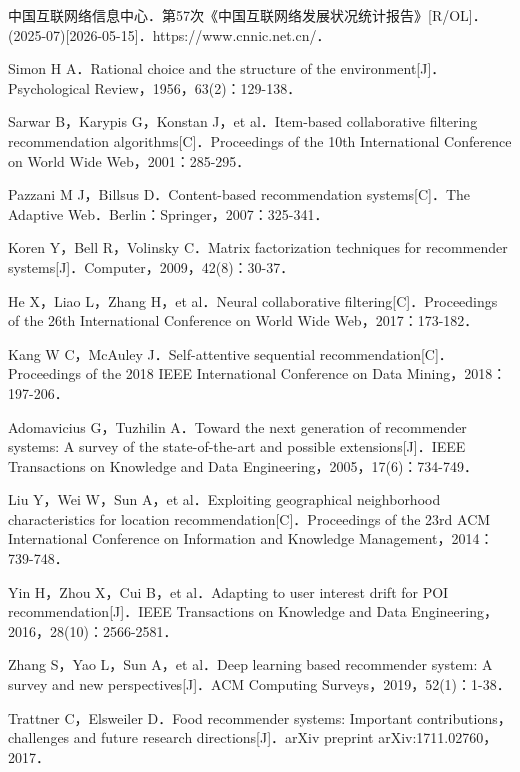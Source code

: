 \begin{flushleft}
\begin{enumerate}[label={[\arabic*]}, leftmargin=2em, itemsep=0.3em]
    \item 中国互联网络信息中心．第57次《中国互联网络发展状况统计报告》[R/OL]．(2025-07)[2026-05-15]．https://www.cnnic.net.cn/．
    \item Simon H A．Rational choice and the structure of the environment[J]．Psychological Review，1956，63(2)：129-138．
    \item Sarwar B，Karypis G，Konstan J，et al．Item-based collaborative filtering recommendation algorithms[C]．Proceedings of the 10th International Conference on World Wide Web，2001：285-295．
    \item Pazzani M J，Billsus D．Content-based recommendation systems[C]．The Adaptive Web．Berlin：Springer，2007：325-341．
    \item Koren Y，Bell R，Volinsky C．Matrix factorization techniques for recommender systems[J]．Computer，2009，42(8)：30-37．
    \item He X，Liao L，Zhang H，et al．Neural collaborative filtering[C]．Proceedings of the 26th International Conference on World Wide Web，2017：173-182．
    \item Kang W C，McAuley J．Self-attentive sequential recommendation[C]．Proceedings of the 2018 IEEE International Conference on Data Mining，2018：197-206．
    \item Adomavicius G，Tuzhilin A．Toward the next generation of recommender systems: A survey of the state-of-the-art and possible extensions[J]．IEEE Transactions on Knowledge and Data Engineering，2005，17(6)：734-749．
    \item Liu Y，Wei W，Sun A，et al．Exploiting geographical neighborhood characteristics for location recommendation[C]．Proceedings of the 23rd ACM International Conference on Information and Knowledge Management，2014：739-748．
    \item Yin H，Zhou X，Cui B，et al．Adapting to user interest drift for POI recommendation[J]．IEEE Transactions on Knowledge and Data Engineering，2016，28(10)：2566-2581．
    \item Zhang S，Yao L，Sun A，et al．Deep learning based recommender system: A survey and new perspectives[J]．ACM Computing Surveys，2019，52(1)：1-38．
    \item Trattner C，Elsweiler D．Food recommender systems: Important contributions，challenges and future research directions[J]．arXiv preprint arXiv:1711.02760，2017．

\end{enumerate}
\end{flushleft}
